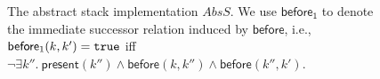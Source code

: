 \begin{figure} [t]
%
%
%    
 \vspace{-4mm}
  \caption{The abstract stack implementation $AbsS$. We use $\mathsf{before_1}$ to denote the immediate successor relation induced by $\mathsf{before}$, i.e., $\mathsf{before}_1(k,k')={\tt true}$ iff $\neg\exists k''.\ \mathsf{present}(k'')\land \mathsf{before}(k,k'')\land \mathsf{before}(k'',k')$.
  }
  \label{fig:transitions:AbsS}
\vspace{-5mm}
\end{figure}

